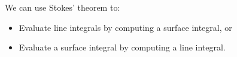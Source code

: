 \begin{frame}
We can use Stokes' theorem to:
\begin{itemize}
  \item Evaluate line integrals by computing a surface integral, or
  \item Evaluate a surface integral by computing a line integral.
\end{itemize}
\end{frame}
